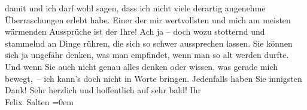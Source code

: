 \begin{ledgroupsized}[t]{13cm}
               damit und ich darf wohl sagen, dass ich nicht viele derartig angenehme Überraschungen
               erlebt habe. Einer der mir wertvollsten und mich am meisten wärmenden Aussprüche ist
               der Ihre! Ach ja – doch wozu stotternd und stammelnd an Dinge rühren, die sich so
               schwer aussprechen lassen. Sie können sich ja ungefähr denken, was man empfindet,
               wenn man so alt werden durfte. Und wenn Sie auch nicht genau alles denken oder
               wissen, was gerade mich bewegt, – ich kann’s doch nicht in Worte bringen. Jedenfalls
               haben Sie innigsten Dank! Sehr herzlich und hoffentlich auf sehr bald!\pend
           \pstart
           Ihr {\\[\baselineskip]}\spacefill\mbox{Felix Salten}\pend
           \leftskip=0em{}
         
         \endnumbering{}\end{ledgroupsized}  \newcommand{\dateiname}{L03587}\newcommand{\titel}{Felix Salten an Arthur Schnitzler, 21. 9. 1929}\newcommand{\editorInnen}{Martin Anton Müller und Laura Untner}
      